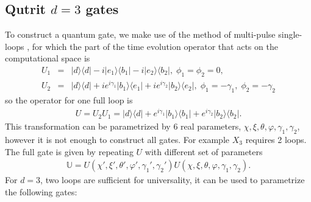 \documentclass[pra,showpacs,priprent,twocolumn,superscriptaddress]{revtex4-1}
\newcommand{\ket}[1]{|#1\rangle}
\newcommand{\bra}[1]{\langle #1|}
\begin{document}
\subsection{Qutrit $d=3$ gates} 
To construct a quantum gate, we make use of the method of multi-pulse single-loops \cite{herterich16}, for which the part of the time evolution operator that acts on the computational space is
\begin{eqnarray}
U_1 & = & \ket{d}\bra{d} -i\ket{e_1}\bra{b_1} -i\ket{e_2}\bra{b_2},\; \phi_1 = \phi_2 = 0,
\nonumber \\
U_2 & = & \ket{d}\bra{d} +ie^{i\gamma_1}\ket{b_1}\bra{e_1} +ie^{i\gamma_2}\ket{b_2}\bra{e_2},\; \phi_1 = -\gamma_1,\; \phi_2 = -\gamma_2
\end{eqnarray}
so the operator for one full loop is 
\begin{eqnarray}
\label{eq:trit-gate-1-loop}
U = U_2U_1 = \ket{d}\bra{d} + e^{i\gamma_1}\ket{b_1}\bra{b_1} + e^{i\gamma_2}\ket{b_2}\bra{b_2}.
\end{eqnarray}
This transformation can be parametrized by $6$ real parameters, $\chi,\xi,\theta,\varphi,\gamma_1,\gamma_2$, however it is not enough to construct all gates. For example $X_3$ requires 2 loops. The full gate is given by repeating $U$ with different set of parameters
\begin{eqnarray}
\label{eq:trit-gate-2-loop}
\mathbb{U} = U(\chi',\xi',\theta',\varphi',\gamma_1',\gamma_2') U(\chi,\xi,\theta,\varphi,\gamma_1,\gamma_2).
\end{eqnarray}
For $d = 3$, two loops are sufficient for universality, it can be used to parametrize the following gates: 
\end{document}
